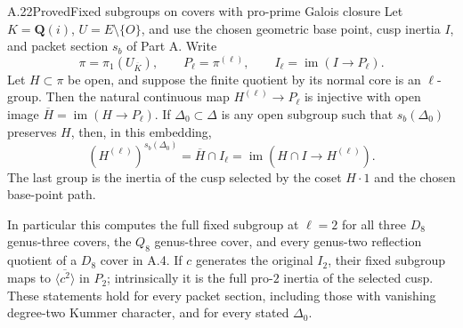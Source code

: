 \begin{statement}{A.22}{Proved}{Fixed subgroups on covers with pro-prime Galois closure}
Let $K=\mathbf Q(i)$, $U=E\setminus\{O\}$, and use the chosen
geometric base point, cusp inertia $I$, and packet section $s_b$
of Part A. Write
\[
 \pi=\pi_1(U_{\overline K}),\qquad
 P_\ell=\pi^{(\ell)},\qquad
 I_\ell=\operatorname{im}(I\to P_\ell).
\]
Let $H\subset\pi$ be open, and suppose the finite quotient by
its normal core is an $\ell$-group. Then the natural continuous
map $H^{(\ell)}\to P_\ell$ is injective with open image
$\overline H=\operatorname{im}(H\to P_\ell)$.
If $\Delta_0\subset\Delta$ is any open subgroup such that
$s_b(\Delta_0)$ preserves $H$, then, in this embedding,
\[
       (H^{(\ell)})^{s_b(\Delta_0)}
           =\overline H\cap I_\ell
           =\operatorname{im}(H\cap I\to H^{(\ell)}).
                                                        \tag{A.22.1}
\]
The last group is the inertia of the cusp selected by the coset
$H\cdot1$ and the chosen base-point path.

In particular this computes the full fixed subgroup at $\ell=2$
for all three $D_8$ genus-three covers, the $Q_8$ genus-three cover,
and every genus-two reflection quotient of a $D_8$ cover in A.4.
If $c$ generates the original $I_2$, their fixed subgroup maps
to $\overline{\langle c^2\rangle}$ in $P_2$; intrinsically it is
the full pro-$2$ inertia of the selected cusp. These statements
hold for every packet section, including those with vanishing
degree-two Kummer character, and for every stated $\Delta_0$.
\end{statement}
